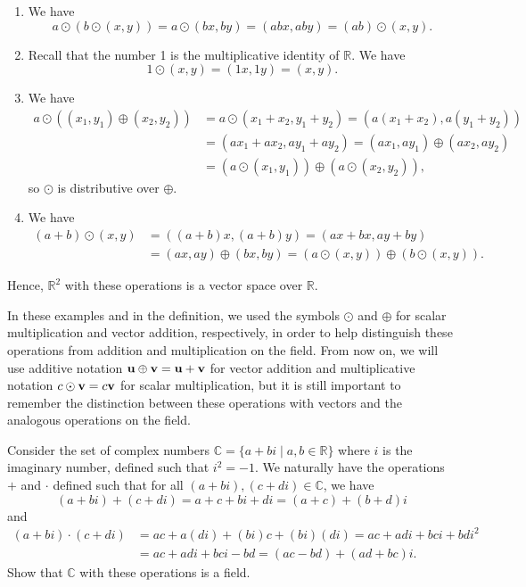 \begin{sltn}
\begin{enumerate}
    \item We have
    \begin{equation*}
        a\odot(b\odot(x,y))=a\odot(bx,by)=(abx,aby)=(ab)\odot(x,y).
    \end{equation*}

    \item Recall that the number 1 is the multiplicative identity of $ \mathbb{R} $. We have
    \begin{equation*}
        1\odot(x,y)=(1x,1y)=(x,y).
    \end{equation*}

    \item We have
    \begin{align*}
        a\odot((x_1,y_1)\oplus(x_2,y_2)) &= a\odot(x_1+x_2,y_1+y_2)=(a(x_1+x_2),a(y_1+y_2)) \\
        &= (ax_1+ax_2,ay_1+ay_2)=(ax_1,ay_1)\oplus(ax_2,ay_2) \\
        &= (a\odot(x_1,y_1))\oplus(a\odot(x_2,y_2)),
    \end{align*}
    so $ \odot $ is distributive over $ \oplus $.

    \item We have
    \begin{align*}
        (a+b)\odot(x,y) &= ((a+b)x,(a+b)y)=(ax+bx,ay+by) \\
        &= (ax,ay)\oplus(bx,by)=(a\odot(x,y))\oplus(b\odot(x,y)).
    \end{align*}
\end{enumerate}
Hence, $ \mathbb{R}^2 $ with these operations is a vector space over $ \mathbb{R} $.
\end{sltn}

In these examples and in the definition, we used the symbols $ \odot $ and $ \oplus $ for scalar multiplication and vector addition, respectively, in order to help distinguish these operations from addition and multiplication on the field. From now on, we will use additive notation $ \boldsymbol{\mathbf{u}}\oplus\boldsymbol{\mathbf{v}}=\boldsymbol{\mathbf{u}}+\boldsymbol{\mathbf{v}} $ for vector addition and multiplicative notation $ c\odot\boldsymbol{\mathbf{v}}=c\boldsymbol{\mathbf{v}} $ for scalar multiplication, but it is still important to remember the distinction between these operations with vectors and the analogous operations on the field.


\begin{exer}\label{exer:cfield}
Consider the set of complex numbers $ \mathbb{C}=\{a+bi\mid a,b\in\mathbb{R}\} $ where $ i $ is the imaginary number, defined such that $ i^2=-1 $. We naturally have the operations $ + $ and $ \cdot $ defined such that for all $ (a+bi),(c+di)\in\mathbb{C} $, we have
\begin{equation*}
    (a+bi)+(c+di)=a+c+bi+di=(a+c)+(b+d)i
\end{equation*}
and
\begin{align*}
    (a+bi)\cdot(c+di) &= ac+a(di)+(bi)c+(bi)(di)=ac+adi+bci+bdi^2 \\
    &= ac+adi+bci-bd=(ac-bd)+(ad+bc)i.
\end{align*}
Show that $ \mathbb{C} $ with these operations is a field.
\end{exer}